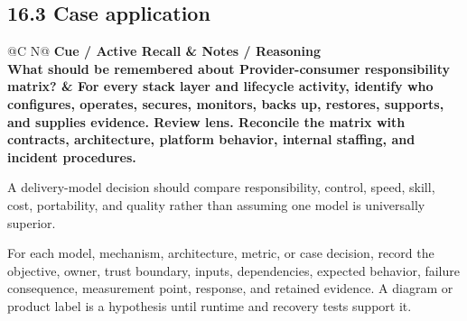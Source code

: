 \documentclass[11pt]{article}
\newcommand{\CornellHeader}{\rowcolor{Navy}\color{white}\bfseries Cue / Active Recall & \color{white}\bfseries Notes / Reasoning \\\endhead}
\newcommand{\CornellRow}[2]{\cellcolor{CueGray}\textbf{#1} & #2 \\\addlinespace[3pt]}
\begin{document}
\subsection{16.3 Case application}
\begin{longtable}{@{}C N@{}}
\CornellHeader
\CornellRow{What should be remembered about Provider-consumer responsibility matrix?}{For every stack layer and lifecycle activity, identify who configures, operates, secures, monitors, backs up, restores, supports, and supplies evidence. \textbf{Review lens.} Reconcile the matrix with contracts, architecture, platform behavior, internal staffing, and incident procedures.}
\end{longtable}
\begin{sectionsummarybox}
A delivery-model decision should compare responsibility, control, speed, skill, cost, portability, and quality rather than assuming one model is universally superior.
\end{sectionsummarybox}
\begin{practicebox}
For each model, mechanism, architecture, metric, or case decision, record the objective, owner, trust boundary, inputs, dependencies, expected behavior, failure consequence, measurement point, response, and retained evidence. A diagram or product label is a hypothesis until runtime and recovery tests support it.
\end{practicebox}
\end{document}
